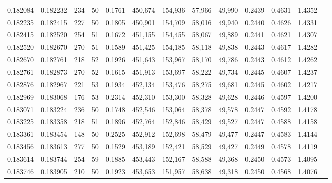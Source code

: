 \begin{tabular}{rrrrrrrrrrrrr}
0.182084 & 0.182232 &   234 &  50 &                                     0.1761 & 450,674 & 154,936 &  57,966 &  49,990 & 0.2439 & 0.4631 & 1.4352 \\
0.182235 & 0.182415 &   227 &  50 &                                     0.1805 & 450,901 & 154,709 &  58,016 &  49,940 & 0.2440 & 0.4626 & 1.4331 \\
0.182415 & 0.182520 &   254 &  51 &                                     0.1672 & 451,155 & 154,455 &  58,067 &  49,889 & 0.2441 & 0.4621 & 1.4307 \\
0.182520 & 0.182670 &   270 &  51 &                                     0.1589 & 451,425 & 154,185 &  58,118 &  49,838 & 0.2443 & 0.4617 & 1.4282 \\
0.182670 & 0.182761 &   218 &  52 &                                     0.1926 & 451,643 & 153,967 &  58,170 &  49,786 & 0.2443 & 0.4612 & 1.4262 \\
0.182761 & 0.182873 &   270 &  52 &                                     0.1615 & 451,913 & 153,697 &  58,222 &  49,734 & 0.2445 & 0.4607 & 1.4237 \\
0.182876 & 0.182967 &   221 &  53 &                                     0.1934 & 452,134 & 153,476 &  58,275 &  49,681 & 0.2445 & 0.4602 & 1.4217 \\
0.182969 & 0.183068 &   176 &  53 &                                     0.2314 & 452,310 & 153,300 &  58,328 &  49,628 & 0.2446 & 0.4597 & 1.4200 \\
0.183071 & 0.183224 &   236 &  50 &                                     0.1748 & 452,546 & 153,064 &  58,378 &  49,578 & 0.2447 & 0.4592 & 1.4178 \\
0.183225 & 0.183358 &   218 &  51 &                                     0.1896 & 452,764 & 152,846 &  58,429 &  49,527 & 0.2447 & 0.4588 & 1.4158 \\
0.183361 & 0.183454 &   148 &  50 &                                     0.2525 & 452,912 & 152,698 &  58,479 &  49,477 & 0.2447 & 0.4583 & 1.4144 \\
0.183456 & 0.183613 &   277 &  50 &                                     0.1529 & 453,189 & 152,421 &  58,529 &  49,427 & 0.2449 & 0.4578 & 1.4119 \\
0.183614 & 0.183744 &   254 &  59 &                                     0.1885 & 453,443 & 152,167 &  58,588 &  49,368 & 0.2450 & 0.4573 & 1.4095 \\
0.183746 & 0.183905 &   210 &  50 &                                     0.1923 & 453,653 & 151,957 &  58,638 &  49,318 & 0.2450 & 0.4568 & 1.4076 \\

\end{tabular}
